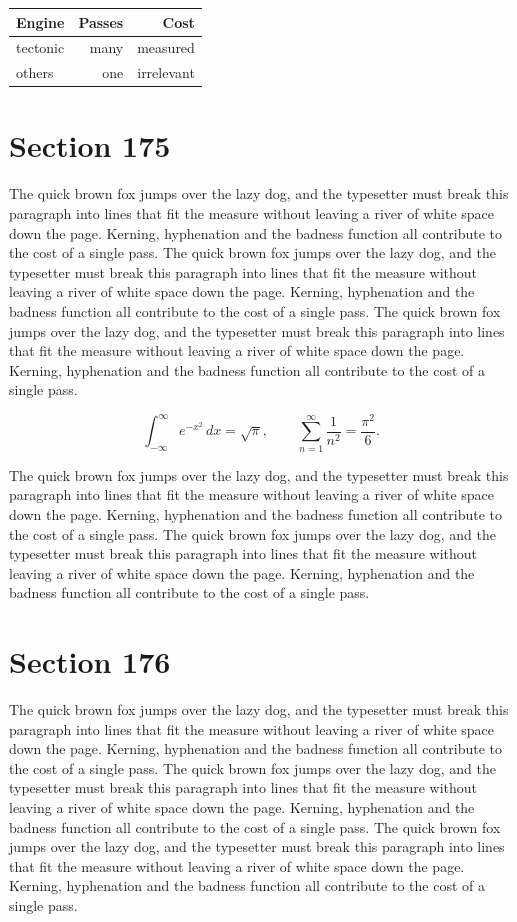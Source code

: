 \documentclass{article}
\begin{document}
\begin{center}
\begin{tabular}{lrr}
\toprule
Engine & Passes & Cost \\
\midrule
tectonic & many & measured \\
others & one & irrelevant \\
\bottomrule
\end{tabular}
\end{center}

\section{Section 175}
The quick brown fox jumps over the lazy dog, and the typesetter must break this paragraph into lines that fit the measure without leaving a river of white space down the page. Kerning, hyphenation and the badness function all contribute to the cost of a single pass. The quick brown fox jumps over the lazy dog, and the typesetter must break this paragraph into lines that fit the measure without leaving a river of white space down the page. Kerning, hyphenation and the badness function all contribute to the cost of a single pass. The quick brown fox jumps over the lazy dog, and the typesetter must break this paragraph into lines that fit the measure without leaving a river of white space down the page. Kerning, hyphenation and the badness function all contribute to the cost of a single pass. 

\begin{equation}
\int_{-\infty}^{\infty} e^{-x^{2}}\,dx = \sqrt{\pi}, \qquad
\sum_{n=1}^{\infty} \frac{1}{n^{2}} = \frac{\pi^{2}}{6}.
\end{equation}

The quick brown fox jumps over the lazy dog, and the typesetter must break this paragraph into lines that fit the measure without leaving a river of white space down the page. Kerning, hyphenation and the badness function all contribute to the cost of a single pass. The quick brown fox jumps over the lazy dog, and the typesetter must break this paragraph into lines that fit the measure without leaving a river of white space down the page. Kerning, hyphenation and the badness function all contribute to the cost of a single pass. 
\section{Section 176}
The quick brown fox jumps over the lazy dog, and the typesetter must break this paragraph into lines that fit the measure without leaving a river of white space down the page. Kerning, hyphenation and the badness function all contribute to the cost of a single pass. The quick brown fox jumps over the lazy dog, and the typesetter must break this paragraph into lines that fit the measure without leaving a river of white space down the page. Kerning, hyphenation and the badness function all contribute to the cost of a single pass. The quick brown fox jumps over the lazy dog, and the typesetter must break this paragraph into lines that fit the measure without leaving a river of white space down the page. Kerning, hyphenation and the badness function all contribute to the cost of a single pass. 
\end{document}
